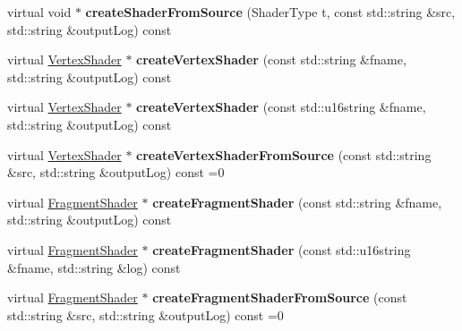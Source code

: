 \begin{DoxyCompactItemize}
\item 
\hypertarget{class_tempest_1_1_abstract_shading_lang_a6863e67dadd5b78df8641d4511f972de}{virtual void $\ast$ {\bfseries create\+Shader\+From\+Source} (Shader\+Type t, const std\+::string \&src, std\+::string \&output\+Log) const }\label{class_tempest_1_1_abstract_shading_lang_a6863e67dadd5b78df8641d4511f972de}

\item 
\hypertarget{class_tempest_1_1_abstract_shading_lang_a0a21d691048dab1129878aa41a7cb575}{virtual \hyperlink{class_tempest_1_1_vertex_shader}{Vertex\+Shader} $\ast$ {\bfseries create\+Vertex\+Shader} (const std\+::string \&fname, std\+::string \&output\+Log) const }\label{class_tempest_1_1_abstract_shading_lang_a0a21d691048dab1129878aa41a7cb575}

\item 
\hypertarget{class_tempest_1_1_abstract_shading_lang_a34cf928a239bd3f8c07f83fb8e41c83e}{virtual \hyperlink{class_tempest_1_1_vertex_shader}{Vertex\+Shader} $\ast$ {\bfseries create\+Vertex\+Shader} (const std\+::u16string \&fname, std\+::string \&output\+Log) const }\label{class_tempest_1_1_abstract_shading_lang_a34cf928a239bd3f8c07f83fb8e41c83e}

\item 
\hypertarget{class_tempest_1_1_abstract_shading_lang_a169752a9b00ee3e7686ff55b82485994}{virtual \hyperlink{class_tempest_1_1_vertex_shader}{Vertex\+Shader} $\ast$ {\bfseries create\+Vertex\+Shader\+From\+Source} (const std\+::string \&src, std\+::string \&output\+Log) const =0}\label{class_tempest_1_1_abstract_shading_lang_a169752a9b00ee3e7686ff55b82485994}

\item 
\hypertarget{class_tempest_1_1_abstract_shading_lang_a7739c3d706a6c0a44a693f928a352ce6}{virtual \hyperlink{class_tempest_1_1_fragment_shader}{Fragment\+Shader} $\ast$ {\bfseries create\+Fragment\+Shader} (const std\+::string \&fname, std\+::string \&output\+Log) const }\label{class_tempest_1_1_abstract_shading_lang_a7739c3d706a6c0a44a693f928a352ce6}

\item 
\hypertarget{class_tempest_1_1_abstract_shading_lang_a9ef79d9a353842e86389adcc5ebf59e9}{virtual \hyperlink{class_tempest_1_1_fragment_shader}{Fragment\+Shader} $\ast$ {\bfseries create\+Fragment\+Shader} (const std\+::u16string \&fname, std\+::string \&log) const }\label{class_tempest_1_1_abstract_shading_lang_a9ef79d9a353842e86389adcc5ebf59e9}

\item 
\hypertarget{class_tempest_1_1_abstract_shading_lang_a6231073ccc9a432d91fbc3707c890c7c}{virtual \hyperlink{class_tempest_1_1_fragment_shader}{Fragment\+Shader} $\ast$ {\bfseries create\+Fragment\+Shader\+From\+Source} (const std\+::string \&src, std\+::string \&output\+Log) const =0}\label{class_tempest_1_1_abstract_shading_lang_a6231073ccc9a432d91fbc3707c890c7c}


\end{DoxyCompactItemize}
